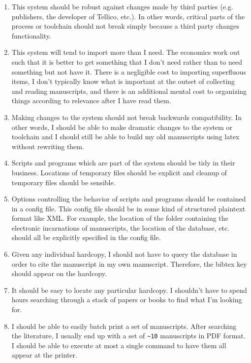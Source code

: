 \documentclass[letterpaper,12pt]{article}
\begin{document}
\begin{enumerate}
\item This system should be robust against changes made by third parties (e.g. publishers, the developer of Tellico, etc.). In other words, critical parts of the process or toolchain should not break simply because a third party changes functionality.

\item This system will tend to import more than I need. The economics work out such that it is better to get something that I don't need rather than to need something but not have it. There is a negligible cost to importing superfluous items, I don't typically know what is important at the outset of collecting and reading manuscripts, and there is an additional mental cost to organizing things according to relevance after I have read them.

\item Making changes to the system should not break backwards compatibility. In other words, I should be able to make dramatic changes to the system or toolchain and I should still be able to build my old manuscripts using latex without rewriting them.


\item Scripts and programs which are part of the system should be tidy in their business. Locations of temporary files should be explicit and cleanup of temporary files should be sensible.

\item Options controlling the behavior of scripts and programs should be contained in a config file. This config file should be in some kind of structured plaintext format like XML. For example, the location of the folder containing the electronic incarnations of manuscripts, the location of the database, etc. should all be explicitly specified in the config file.


\item Given any individual hardcopy, I should not have to query the database in order to cite the manuscript in my own manuscript. Therefore, the bibtex key should appear on the hardcopy.

\item It should be easy to locate any particular hardcopy. I shouldn't have to spend hours searching through a stack of papers or books to find what I'm looking for.

\item I should be able to easily batch print a set of manuscripts. After searching the literature, I usually end up with a set of \verb|~10| manuscripts in PDF format. I should be able to execute at most a single command to have them all appear at the printer.


\end{enumerate}
\end{document}
